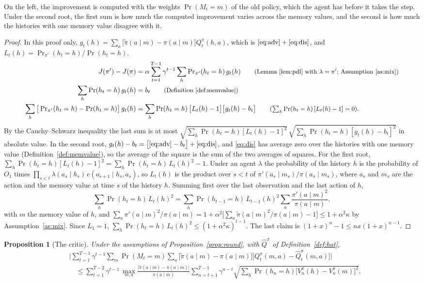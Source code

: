 \documentclass{article}
\newtheorem{proposition}{Proposition}[section]
\theoremstyle{definition}
\newcommand{\Prn}{\Pr\nolimits_{\pi'}}
\newcommand{\why}[1]{\tag*{\small(#1)}}
\begin{document}
On the left, the improvement is computed with the weights $\Pr(M_t=m)$ of the old policy, which the agent has before it takes the step. Under the second root, the first sum is how much the computed improvement varies across the memory values, and the second is how much the histories with one memory value disagree with it.

\begin{proof}
In this proof only, $g_t(h)=\sum_a\big[\tilde\pi(a\mid m)-\pi(a\mid m)\big]Q^\pi_t(h,a)$, which is $\eqref{eq:adv}+\eqref{eq:dis}$, and $L_t(h)=\Prn(h_t=h)/\Pr(h_t=h)$.
\begin{align*}
J(\pi')-J(\pi)&=\alpha\sum_{t=1}^{T-1}\gamma^{t-1}\sum_h\Prn(h_t=h)\,g_t(h) \why{Lemma~\ref{lem:pdl} with $\lambda=\pi'$; Assumption~\ref{as:mix}}\\
\sum_h\Pr(h_t=h)\,g_t(h)&=b_t \why{Definition~\ref{def:memvalue}}\\
\sum_h\big[\Prn(h_t=h)-\Pr(h_t=h)\big]\,g_t(h)&=\sum_h\Pr(h_t=h)\,\big[L_t(h)-1\big]\big[g_t(h)-b_t\big] \why{$\sum_h\Pr(h_t=h)\,[L_t(h)-1]=0$}.
\end{align*}
By the Cauchy--Schwarz inequality the last sum is at most $\sqrt{\sum_h\Pr(h_t=h)[L_t(h)-1]^2}\,\sqrt{\sum_h\Pr(h_t=h)[g_t(h)-b_t]^2}$ in absolute value. In the second root, $g_t(h)-b_t=\big[\eqref{eq:adv}-b_t\big]+\eqref{eq:dis}$, and \eqref{eq:dis} has average zero over the histories with one memory value (Definition~\ref{def:memvalue}), so the average of the square is the sum of the two averages of squares. For the first root, $\sum_h\Pr(h_t=h)[L_t(h)-1]^2=\sum_h\Pr(h_t=h)\,L_t(h)^2-1$. Under an agent $\lambda$ the probability of the history $h$ is the probability of $O_1$ times $\prod_{s<t}\lambda(a_s\mid h_s)\,e(o_{s+1}\mid h_s,a_s)$, so $L_t(h)$ is the product over $s<t$ of $\pi'(a_s\mid m_s)/\pi(a_s\mid m_s)$, where $a_s$ and $m_s$ are the action and the memory value at time $s$ of the history $h$. Summing first over the last observation and the last action of $h$,
\[
\sum_h\Pr(h_t=h)\,L_t(h)^2=\sum_{h}\Pr(h_{t-1}=h)\,L_{t-1}(h)^2\sum_a\frac{\pi'(a\mid m)^2}{\pi(a\mid m)},
\]
with $m$ the memory value of $h$, and $\sum_a\pi'(a\mid m)^2/\pi(a\mid m)=1+\alpha^2\big[\sum_a\tilde\pi(a\mid m)^2/\pi(a\mid m)-1\big]\le1+\alpha^2\kappa$ by Assumption~\ref{as:mix}. Since $L_1=1$, $\sum_h\Pr(h_t=h)\,L_t(h)^2\le(1+\alpha^2\kappa)^{t-1}$. The last claim is $(1+x)^n-1\le nx(1+x)^{n-1}$.
\end{proof}

\begin{proposition}[The critic]\label{prop:critic}
Under the assumptions of Proposition~\ref{prop:round}, with $\hat Q^\pi$ of Definition~\ref{def:hat},
\begin{align*}
&\Big|\sum_{t=1}^{T-1}\gamma^{t-1}\sum_m\Pr(M_t=m)\sum_a\big[\tilde\pi(a\mid m)-\pi(a\mid m)\big]\big[Q^\pi_t(m,a)-\hat Q^\pi_t(m,a)\big]\Big|\\
&\quad\le\sum_{t=1}^{T-2}\gamma^{t-1}\,\max_{m,a}\frac{\big|\tilde\pi(a\mid m)-\pi(a\mid m)\big|}{\pi(a\mid m)}\sum_{n=t+1}^{T-1}\gamma^{n-t}\sqrt{\sum_h\Pr(h_n=h)\big[V^\pi_n(h)-V^\pi_n(m)\big]^2}.
\end{align*}
\end{proposition}
\end{document}
